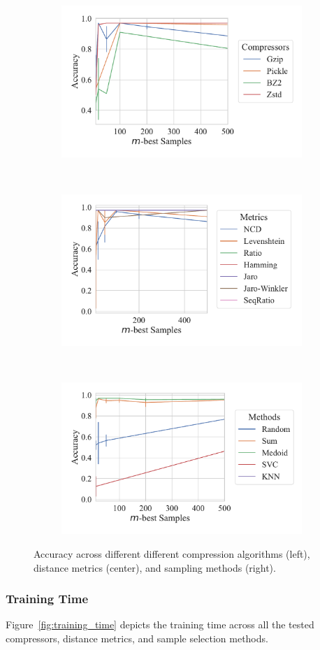 \documentclass[sigconf]{acmart}
\begin{document}
\begin{figure}
	\begin{subfigure}
		\centering
		\includegraphics[width=.32\textwidth]{figs/truthseeker/compressor_vs_accuracy.pdf}
	\end{subfigure}%
	~
	\begin{subfigure}
		\centering
		\includegraphics[width=.32\textwidth]{figs/truthseeker/metric_vs_accuracy.pdf}
	\end{subfigure}
	~
	\begin{subfigure}
		\centering
		\includegraphics[width=.32\textwidth]{figs/truthseeker/method_vs_accuracy.pdf}
	\end{subfigure}
	\caption{Accuracy across different different compression algorithms (left), distance metrics (center), and sampling methods (right).}
	\label{fig:accuracy}
\end{figure}

\subsubsection{Training Time}

Figure~\ref{fig:training_time} depicts the training time across all the tested compressors, distance metrics, and sample selection methods.
\end{document}
